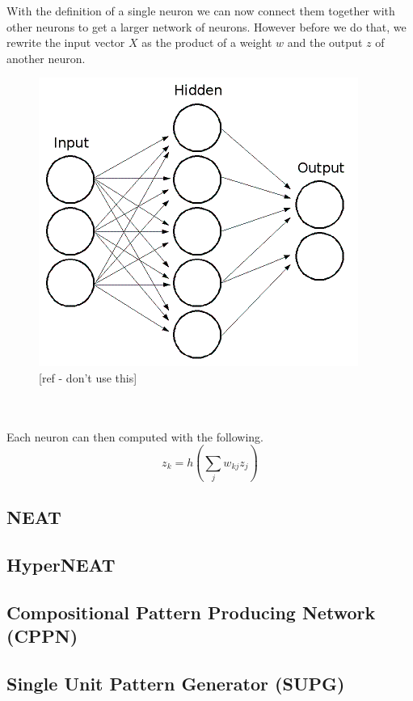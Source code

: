 \documentclass[11pt, a4paper]{article}
\begin{document}
With the definition of a single neuron we can now connect them together with other neurons to get a larger network of neurons. However before we do that, we rewrite the input vector $ X $ as the product of a weight $ w $ and the output $ z $ of another neuron.
\begin{figure}[!ht]
\centering
\includegraphics[scale=0.7]{NeuralNetwork}
\caption{[ref - don't use this]}
\end{figure}
\\
\\
Each neuron can then computed with the following.
\begin{equation}
z_k = h(\sum\limits_{j}{w_{kj} z_j})
\end{equation}
\subsection{NEAT}
\subsection{HyperNEAT}
\subsection{Compositional Pattern Producing Network (CPPN)}
\subsection{Single Unit Pattern Generator (SUPG)}
\end{document}
